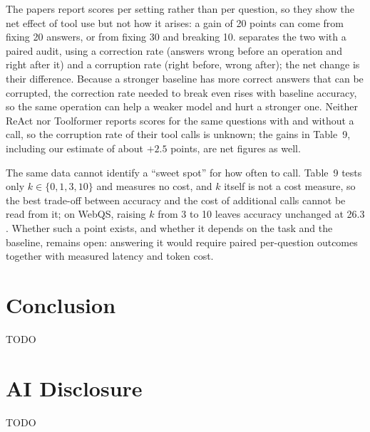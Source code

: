 \documentclass[11pt]{article}
\begin{document}
The papers report scores per setting rather than per question, so
they show the net effect of tool use but not how it arises: a gain of
20 points can come from fixing 20 answers, or from fixing 30 and
breaking 10. \citet{reitich2026correction} separates the two with a
paired audit, using a correction rate (answers wrong before an
operation and right after it) and a corruption rate (right before,
wrong after); the net change is their difference. Because a stronger
baseline has more correct answers that can be corrupted, the
correction rate needed to break even rises with baseline accuracy, so
the same operation can help a weaker model and hurt a stronger one.
Neither ReAct nor Toolformer reports scores for the same questions
with and without a call, so the corruption rate of their tool calls is
unknown; the gains in Table~9, including our estimate of about $+2.5$
points, are net figures as well.

The same data cannot identify a ``sweet spot'' for how often to call.
Table~9 tests only $k \in \{0, 1, 3, 10\}$ and measures no cost, and
$k$ itself is not a cost measure, so the best trade-off between
accuracy and the cost of additional calls cannot be read from it; on
WebQS, raising $k$ from 3 to 10 leaves accuracy unchanged at 26.3
\citep{schick2023toolformer}. Whether such a point exists, and whether
it depends on the task and the baseline, remains open: answering it
would require paired per-question outcomes together with measured
latency and token cost.

\section{Conclusion}
\label{sec:conclusion}
TODO

\label{endofbody}

\section*{AI Disclosure}
TODO

\nocite{*} %

\end{document}
